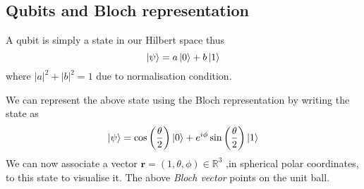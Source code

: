 \documentclass{physics_article}
\begin{document}
 	\subsection{Qubits and Bloch representation}
 	A qubit is simply a state in our Hilbert space thus
 	\begin{equation}
 		\ket{\psi} = a\ket{0} + b\ket{1}
 	\end{equation}
 	where $|a|^2+|b|^2 = 1$ due to normalisation condition.

 	We can represent the above state using the Bloch representation\cite{nielsen_chuang_2021} by writing the state as
 	\begin{equation}
 		\ket{\psi} = \cos\left(\frac{\theta}{2}\right)\ket{0} + e^{i\phi}\sin\left(\frac{\theta}{2}\right)\ket{1}
 	\end{equation}
 	We can now associate a vector $\bm{r} = (1,\theta,\phi)\in\mathbb{R}^3$ ,in spherical polar coordinates, to this state to visualise it. The above \emph{Bloch vector} points on the unit ball.



 	
 	
\end{document}
